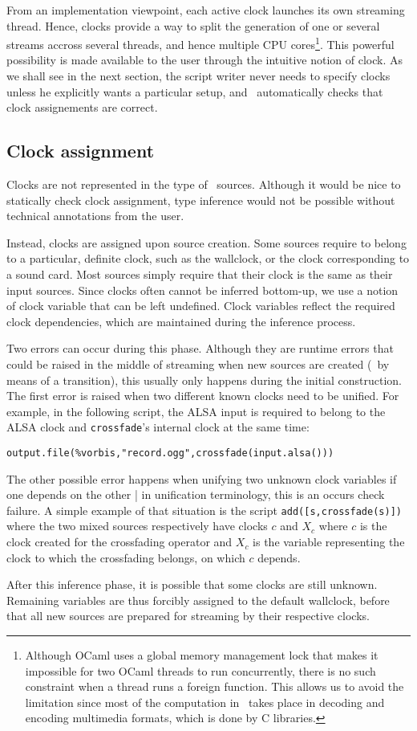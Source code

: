 From an implementation viewpoint, each active clock launches
its own streaming thread.
Hence, clocks provide a way to split the generation of one or
several streams accross several threads,
and hence multiple CPU cores\footnote{
  Although OCaml uses a global memory management lock that makes it
  impossible for two OCaml threads to run concurrently, there is no
  such constraint when a thread runs a foreign function.
  This allows us to avoid the limitation since
  most of the computation in \liquidsoap\ takes place in decoding
  and encoding multimedia formats, which is done by C libraries.
}.
This powerful possibility is made available to the user
through the intuitive notion of clock.
As we shall see in the next section,
the script writer never needs to specify clocks unless he
explicitly wants a particular setup,
and \liquidsoap\ automatically checks that clock assignements
are correct.


\subsection{Clock assignment}

Clocks are not represented in the type of \liquidsoap\ sources.
Although it would be nice to statically check clock assignment,
type inference would not be possible without technical annotations
from the user.

Instead, clocks are assigned upon source creation.
Some sources require to belong to a particular, definite clock,
such as the wallclock, or the clock corresponding to a sound card.
Most sources simply require that their clock is the same as their
input sources.
Since clocks often cannot be inferred bottom-up, we use a notion
of clock variable that can be left undefined.
Clock variables reflect the required clock dependencies,
which are maintained during the inference process.

Two errors can occur during this phase.
Although they are runtime errors that could be raised
in the middle of streaming when new sources are created
(\eg\ by means of a transition),
this usually only happens during the initial construction.
The first error is raised when
two different known clocks need to be unified.
For example, in the following script, the ALSA input is
required to belong to the ALSA clock and \verb.crossfade.'s internal clock
at the same time:
\begin{verbatim}
output.file(%vorbis,"record.ogg",crossfade(input.alsa()))
\end{verbatim}
The other possible error happens when unifying two unknown clock variables
if one depends on the other | in unification terminology, this is an occurs
check failure. A simple example of that situation is
the script \verb.add([s,crossfade(s)]). where the two mixed sources
respectively have clocks $c$ and $X_c$ where $c$ is the clock created
for the crossfading operator and $X_c$ is the variable representing
the clock to which the crossfading belongs, on which $c$ depends.

After this inference phase, it is possible that some clocks are still
unknown. Remaining variables are thus forcibly assigned to the default
wallclock, before that all new sources are prepared for streaming
by their respective clocks.
